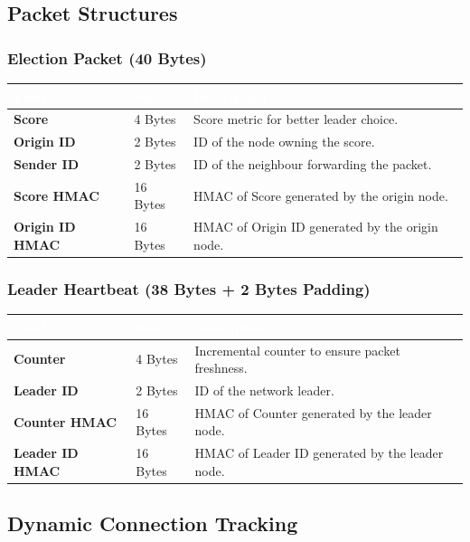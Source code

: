 \documentclass[11pt,a4paper]{article}
\begin{document}
\subsection{Packet Structures}

\subsubsection*{Election Packet (40 Bytes)}

\begin{longtable}{@{}>{\bfseries}p{3.4cm}p{2cm}p{8.5cm}@{}}
\toprule
\rowcolor{havennavy}
\textcolor{white}{Field} & \textcolor{white}{Size} & \textcolor{white}{Description} \\
\midrule
\endhead
Score & 4 Bytes & Score metric for better leader choice. \\
Origin ID & 2 Bytes & ID of the node owning the score. \\
Sender ID & 2 Bytes & ID of the neighbour forwarding the packet. \\
Score HMAC & 16 Bytes & HMAC of Score generated by the origin node. \\
Origin ID HMAC & 16 Bytes & HMAC of Origin ID generated by the origin node. \\
\bottomrule
\end{longtable}

\subsubsection*{Leader Heartbeat (38 Bytes + 2 Bytes Padding)}

\begin{longtable}{@{}>{\bfseries}p{3.4cm}p{2cm}p{8.5cm}@{}}
\toprule
\rowcolor{havennavy}
\textcolor{white}{Field} & \textcolor{white}{Size} & \textcolor{white}{Description} \\
\midrule
\endhead
Counter & 4 Bytes & Incremental counter to ensure packet freshness. \\
Leader ID & 2 Bytes & ID of the network leader. \\
Counter HMAC & 16 Bytes & HMAC of Counter generated by the leader node. \\
Leader ID HMAC & 16 Bytes & HMAC of Leader ID generated by the leader node. \\
\bottomrule
\end{longtable}

\subsection{Dynamic Connection Tracking}
\end{document}
